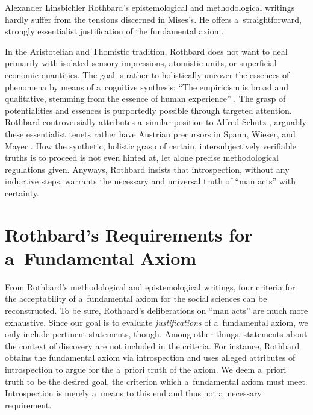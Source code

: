 \begin{artengenv}{Alexander Linsbichler}
Rothbard's epistemological and methodological writings hardly suffer from the tensions discerned in Mises's. He offers a~straightforward, strongly essentialist justification of the fundamental axiom.



In the Aristotelian and Thomistic tradition, Rothbard does not want to deal primarily with isolated sensory impressions, atomistic units, or superficial economic quantities. The goal is rather to holistically uncover the essences of phenomena by means of a~cognitive synthesis: ``The empiricism is broad and qualitative, stemming from the essence of human experience'' 
\parencite[][p.xvi]{mises_preface_2007}. %
 The grasp of potentialities and essences is purportedly possible through targeted attention. Rothbard controversially attributes a~similar position to Alfred Schütz 
\parencites[][]{rothbard_praxeology_2011}[][]{rothbard_praxeology:_1976}, %
 arguably these essentialist tenets rather have Austrian precursors in Spann, Wieser, and Mayer 
\parencites[][]{milford_abkopplung_1997}[][]{linsbichler_viel_2022}. %
 How the synthetic, holistic grasp of certain, intersubjectively verifiable truths is to proceed is not even hinted at, let alone precise methodological regulations given. Anyways, Rothbard insists that introspection, without any inductive steps, warrants the necessary and universal truth of ``man acts'' with certainty.



\section{Rothbard's Requirements for a~Fundamental Axiom }

From Rothbard's methodological and epistemological writings, four criteria for the acceptability of a~fundamental axiom for the social sciences can be reconstructed. To be sure, Rothbard's deliberations on ``man acts'' are much more exhaustive. Since our goal is to evaluate \textit{justifications} of a~fundamental axiom, we only include pertinent statements, though. Among other things, statements about the context of discovery are not included in the criteria. For instance, Rothbard obtains the fundamental axiom via introspection and uses alleged attributes of introspection to argue for the a~priori truth of the axiom. We deem a~priori truth to be the desired goal, the criterion which a~fundamental axiom must meet. Introspection is merely a~means to this end and thus not a~necessary requirement.




\end{artengenv}
